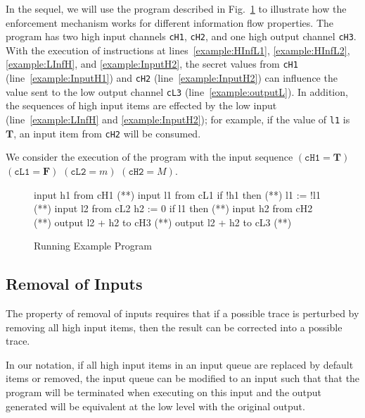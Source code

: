 \documentclass[10pt,a4paper,oneside]{article}
\def\VTRUE{\ensuremath{\textbf{T}}}
\def\VFALSE{\ensuremath{\textbf{F}}}
\def\qItem#1#2{\ensuremath{(\linecode{#1}=#2)}}
\def\linecode#1{{\texttt{#1}}}
\begin{document}
In the sequel, we will use the program described in Fig.~\ref{fig:example:source} to illustrate how the enforcement mechanism works for different information flow properties. The program has two high input channels \linecode{cH1}, \linecode{cH2}, and one high output channel \linecode{cH3}. With the execution of instructions at lines~\ref{example:HInfL1}, \ref{example:HInfL2}, \ref{example:LInfH}, and \ref{example:InputH2}, the secret values from \linecode{cH1} (line~\ref{example:InputH1}) and \linecode{cH2} (line~\ref{example:InputH2}) can influence the value sent to the low output channel \linecode{cL3} (line~\ref{example:outputL}). In addition, the sequences of high input items are effected by the low input (line~\ref{example:LInfH} and \ref{example:InputH2}); for example, if the value of \linecode{l1} is \VTRUE, an input item from \linecode{cH2} will be consumed.

We consider the execution of the program with the input sequence \qItem{cH1}{\VTRUE} \qItem{cL1}{\VFALSE} \qItem{cL2}{m} \qItem{cH2}{M}. 


\begin{figure}[!t]
\begin{javascript}
input h1 from cH1          (*\label{example:InputH1}*)
input l1 from cL1
if !h1 then                (*\label{example:HInfL1}*)
    l1 := !l1              (*\label{example:HInfL2}*)
input l2 from cL2
h2 := 0
if l1 then	               (*\label{example:LInfH}*)
    input h2 from cH2      (*\label{example:InputH2}*)
output l2 + h2 to cH3      (*\label{example:outputH}*)
output l2 + h2 to cL3	   (*\label{example:outputL}*)
\end{javascript}
\caption{Running Example Program}
\label{fig:example:source}
\end{figure}


\subsection{Removal of Inputs}\label{sec:em:RI}

The property of removal of inputs \cite{MANT-00-CSF} requires that if a possible trace is perturbed by removing all high input items, then the result can be corrected into a possible trace.


In our notation, if all high input items in an input queue are replaced by default items or removed, the input queue can be modified to an input such that that the program will be terminated when executing on this input and the output generated will be equivalent at the low level with the original output.
\end{document}
